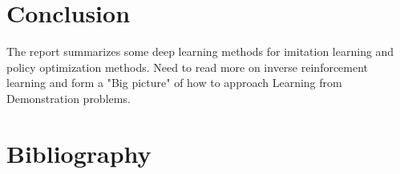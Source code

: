 \documentclass[11pt]{article}
\begin{document}
\section{Conclusion}
The report summarizes some deep learning methods for imitation learning and policy optimization methods. Need to read more on inverse reinforcement learning and form a "Big picture" of how to approach Learning from Demonstration problems. 

\section{Bibliography}


 
%
\end{document}
